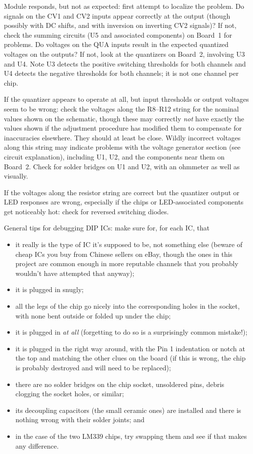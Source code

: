 Module responds, but not as expected:  first attempt to localize the
problem.  Do signals on the CV1 and CV2 inputs appear correctly at the
output (though possibly with DC shifts, and with inversion on inverting CV2
signals)?  If not, check the summing circuits (U5 and associated components)
on Board~1 for problems.  Do voltages on the QUA inputs result in the
expected quantized voltages on the outputs?  If not, look at the quantizers
on Board~2, involving U3 and U4.  Note U3 detects the positive switching
thresholds for both channels and U4 detects the negative thresholds for both
channels; it is not one channel per chip.

If the quantizer appears to operate at all, but input thresholds or output
voltages seem to be wrong: check the voltages along the R8--R12 string for
the nominal values shown on the schematic, though these may correctly
\emph{not} have exactly the values shown if the adjustment procedure has
modified them to compensate for inaccuracies elsewhere.  They should at
least be close.  Wildly incorrect voltages along this string may indicate
problems with the voltage generator section (see circuit explanation),
including U1, U2, and the components near them on Board~2.  Check for solder
bridges on U1 and U2, with an ohmmeter as well as visually.

If the voltages along the resistor string are correct but the quantizer
output or LED responses are wrong, especially if the chips or LED-associated
components get noticeably hot: check for reversed switching diodes.

General tips for debugging DIP ICs:  make sure for, for each IC, that
\begin{itemize}
  \item it really is the type of IC it's supposed to be, not something else
    (beware of cheap ICs you buy from Chinese sellers on eBay, though the
    ones in this project are common enough in more reputable channels that
    you probably wouldn't have attempted that anyway);
  \item it is plugged in snugly;
  \item all the legs of the chip go nicely into the corresponding holes in
    the socket, with none bent outside or folded up under the chip;
  \item it is plugged in \emph{at all} (forgetting to do so is a surprisingly
    common mistake!);
  \item it is plugged in the right way around, with the Pin 1
    indentation or notch at the top and matching the other clues on the
    board (if this is wrong, the chip is probably destroyed and will need to
    be replaced);
  \item there are no solder bridges on the chip socket, unsoldered pins,
    debris clogging the socket holes, or similar;
  \item its decoupling capacitors (the small ceramic ones) are installed and
    there is nothing wrong with their solder joints; and
  \item in the case of the two LM339 chips, try swapping them and see if that
    makes any difference.
\end{itemize}
